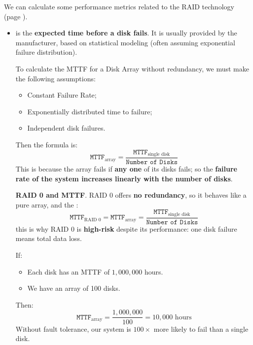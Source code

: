 We can calculate some performance metrics related to the RAID technology (page \pageref{paragraph: RAID}).
\begin{itemize}
    \item {} is the \textbf{expected time before a disk fails}. It is usually provided by the manufacturer, based on statistical modeling (often assuming exponential failure distribution).
    
    To calculate the MTTF for a Disk Array without redundancy, we must make the following assumptions:
    \begin{itemize}
        \item Constant Failure Rate;
        \item Exponentially distributed time to failure;
        \item Independent disk failures.
    \end{itemize}
    Then the formula is:
    \begin{equation}
        \texttt{MTTF}_{\text{array}} = \dfrac{\texttt{MTTF}_{\text{single disk}}}{\texttt{Number of Disks}}
    \end{equation}
    This is because the array fails if \textbf{any one} of its disks fails; so the \textbf{failure rate of the system increases linearly with the number of disks}.

    \textcolor{Red2}{ \textbf{RAID 0 and MTTF}}. RAID 0 offers \textbf{no redundancy}, so it behaves like a pure array, and the :
    \begin{equation}
        \texttt{MTTF}_{\text{RAID 0}} = \texttt{MTTF}_{\text{array}} = \dfrac{\texttt{MTTF}_{\text{single disk}}}{\texttt{Number of Disks}}
    \end{equation}
    this is why RAID 0 is \textbf{high-risk} despite its performance: one disk failure means total data loss.

    \begin{examplebox}[: MTTF]
        If:
        \begin{itemize}
            \item Each disk has an MTTF of $1,000,000$ hours.
            \item We have an array of 100 disks.
        \end{itemize}
        Then:
        \begin{equation*}
            \texttt{MTTF}_{\text{array}} = \dfrac{1,000,000}{100} = 10,000 \text{ hours}
        \end{equation*}
        Without fault tolerance, our system is $100\times$ more likely to fail than a single disk.
    \end{examplebox}


\end{itemize}
